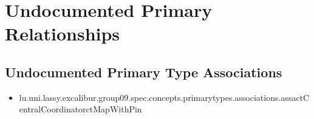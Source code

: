 \section[Undocumented Primary Type Relationships]{Undocumented Primary Relationships}

\subsection[Undocumented Primary Type Associations]{Undocumented Primary Type Associations}
\begin{itemize}
\item lu.uni.lassy.excalibur.group09.spec.concepts.primarytypes.associations.assactCentralCoordinatorctMapWithPin 
\end{itemize}






















